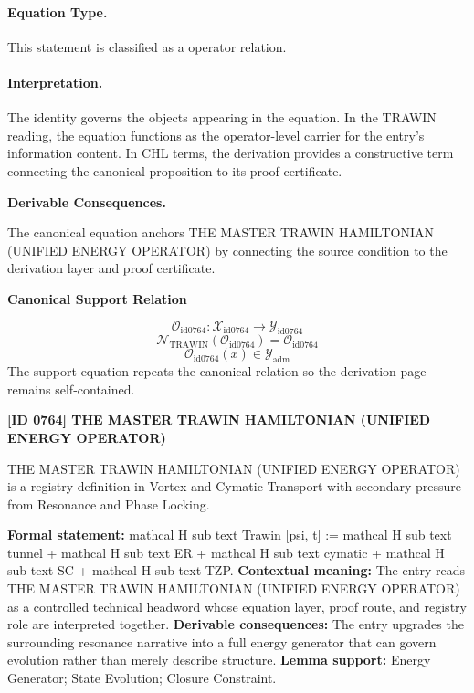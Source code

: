 \paragraph{Equation Type.}
This statement is classified as a operator relation.

\paragraph{Interpretation.}
The identity governs the objects appearing in the equation. In the TRAWIN reading, the equation functions as the operator-level carrier for the entry’s information content. In CHL terms, the derivation provides a constructive term connecting the canonical proposition to its proof certificate.

\par\vspace{0.35em}
\noindent\textbf{Derivable Consequences.}\quad
\begingroup
\footnotesize
\raggedright
The canonical equation anchors THE MASTER TRAWIN HAMILTONIAN (UNIFIED ENERGY OPERATOR) by connecting the source condition to the derivation layer and proof certificate.
\par\endgroup

\noindent\textbf{Canonical Support Relation}\par
\[
\mathcal{O}_{\mathrm{id0764}}:\mathcal{X}_{\mathrm{id0764}}\longrightarrow\mathcal{Y}_{\mathrm{id0764}}
\]
\[
\mathcal{N}_{\mathrm{TRAWIN}}(\mathcal{O}_{\mathrm{id0764}})=\mathcal{O}_{\mathrm{id0764}}
\]
\[
\mathcal{O}_{\mathrm{id0764}}(x)\in\mathcal{Y}_{\mathrm{adm}}
\]
\noindent The support equation repeats the canonical relation so the derivation page remains self-contained.\par

\clearpage
\noindent\textbf{[ID 0764] THE MASTER TRAWIN HAMILTONIAN (UNIFIED ENERGY OPERATOR)}\par
\vspace{0.35em}
\begingroup\small
{}
THE MASTER TRAWIN HAMILTONIAN (UNIFIED ENERGY OPERATOR) is a registry definition in Vortex and Cymatic Transport with secondary pressure from Resonance and Phase Locking.

\begingroup\footnotesize\setlength{\emergencystretch}{3em}\sloppy
\textbf{Formal statement:} mathcal H sub text Trawin [psi, t] := mathcal H sub text tunnel + mathcal H sub text ER + mathcal H sub text cymatic + mathcal H sub text SC + mathcal H sub text TZP. \textbf{Contextual meaning:} The entry reads THE MASTER TRAWIN HAMILTONIAN (UNIFIED ENERGY OPERATOR) as a controlled technical headword whose equation layer, proof route, and registry role are interpreted together. \textbf{Derivable consequences:} The entry upgrades the surrounding resonance narrative into a full energy generator that can govern evolution rather than merely describe structure. \textbf{Lemma support:} Energy Generator; State Evolution; Closure Constraint.\par
\endgroup

